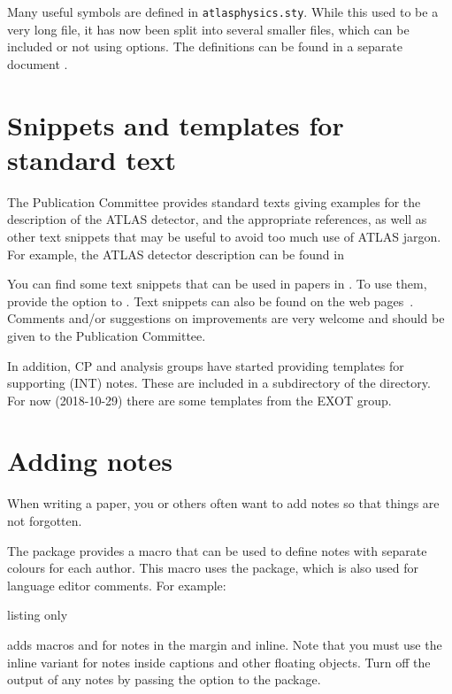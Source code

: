 Many useful symbols are defined in \texttt{atlasphysics.sty}.
While this used to be a very long file, it has now been split into several smaller files,
which can be included or not using options.
The definitions can be found in a separate document .


\section{Snippets and templates for standard text}
\label{sec:atlassnippets}

The Publication Committee provides standard texts giving examples
for the description of the ATLAS detector, and the appropriate references,
as well as other text snippets that may be useful to avoid too much use of ATLAS jargon.
For example, the ATLAS detector description can be found in 

You can find some text snippets that can be used in papers in .
To use them, provide the  option to .
Text snippets can also be found on the web pages~\cite{pubcom-snippet}.
Comments and/or suggestions on improvements are very welcome and
should be given to the Publication Committee.

In addition, CP and analysis groups have started providing templates for supporting (INT) notes.
These are included in a subdirectory of the  directory.
For now (2018-10-29) there are some templates from the EXOT group.


\section{Adding notes}
\label{sec:todo}

When writing a paper, you or others often want to add notes so that things are not forgotten.

The  package provides a macro  that can be used to define notes with separate colours for each author.
This macro uses the  package,
which is also used for language editor comments.
For example:
\begin{tcblisting}{listing only}
\end{tcblisting}
adds macros  and  for notes in the margin and inline.
Note that you must use the inline variant for notes inside captions and other floating objects.
Turn off the output of any notes by passing the option 
to the  package.

